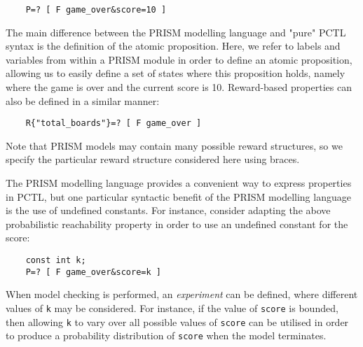 \begin{verbatim}
    P=? [ F game_over&score=10 ]
\end{verbatim}

The main difference between the PRISM modelling language and "pure" PCTL syntax is the definition of the atomic proposition. Here, we refer to labels and variables from within a PRISM module in order to define an atomic proposition, allowing us to easily define a set of states where this proposition holds, namely where the game is over and the current score is 10. Reward-based properties can also be defined in a similar manner:

\begin{verbatim}
    R{"total_boards"}=? [ F game_over ]
\end{verbatim}

Note that PRISM models may contain many possible reward structures, so we specify the particular reward structure considered here using braces.

The PRISM modelling language provides a convenient way to express properties in PCTL, but one particular syntactic benefit of the PRISM modelling language is the use of undefined constants. For instance, consider adapting the above probabilistic reachability property in order to use an undefined constant for the score:

\begin{verbatim}
    const int k;
    P=? [ F game_over&score=k ]
\end{verbatim}

When model checking is performed, an \emph{experiment} can be defined, where different values of \verb+k+ may be considered. For instance, if the value of \verb+score+ is bounded, then allowing \verb+k+ to vary over all possible values of \verb+score+ can be utilised in order to produce a probability distribution of \verb+score+ when the model terminates.

% 
% 

